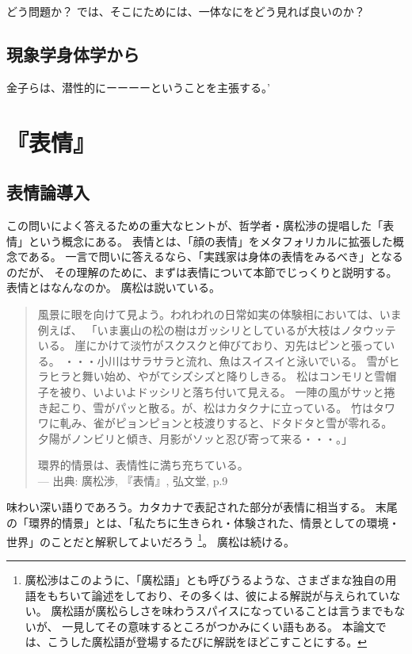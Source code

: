どう問題か？
では、そこにためには、一体なにをどう見れば良いのか？

\subsection{現象学身体学から}
金子らは、潜性的にーーーーということを主張する。’

\section{『表情』}
\subsection{表情論導入}
この問いによく答えるための重大なヒントが、哲学者・廣松渉\cite{hiromatsu:1989}の提唱した「表情」という概念にある。
表情とは、「顔の表情」をメタフォリカルに拡張した概念である。
一言で問いに答えるなら、「実践家は身体の表情をみるべき」となるのだが、
その理解のために、まずは表情について本節でじっくりと説明する。
表情とはなんなのか。
廣松は説いている。
\begin{quotation}
  風景に眼を向けて見よう。われわれの日常如実の体験相においては、いま例えば、
  「いま裏山の松の樹はガッシリとしているが大枝はノタウッテいる。
  崖にかけて淡竹がスクスクと伸びており、刃先はピンと張っている。
  ・・・小川はサラサラと流れ、魚はスイスイと泳いでいる。
  雪がヒラヒラと舞い始め、やがてシズシズと降りしきる。
  松はコンモリと雪帽子を被り、いよいよドッシリと落ち付いて見える。
  一陣の風がサッと捲き起こり、雪がパッと散る。が、松はカタクナに立っている。
  竹はタワワに軋み、雀がピョンピョンと枝渡りすると、ドタドタと雪が零れる。
  夕陽がノンビリと傾き、月影がソッと忍び寄って来る・・・。」

  環界的情景は、表情性に満ち充ちている。\\
  --- 出典: 廣松渉, 『表情』, 弘文堂, p.9
\end{quotation}
味わい深い語りであろう。カタカナで表記された部分が表情に相当する。
末尾の「環界的情景」とは、「私たちに生きられ・体験された、情景としての環境・世界」のことだと解釈してよいだろう
\footnote{
  廣松渉はこのように、「廣松語」とも呼びうるような、さまざまな独自の用語をもちいて論述をしており、その多くは、彼による解説が与えられていない。
  廣松語が廣松らしさを味わうスパイスになっていることは言うまでもないが、
  一見してその意味するところがつかみにくい語もある。
  本論文では、こうした廣松語が登場するたびに解説をほどこすことにする。
}。
廣松は続ける。

